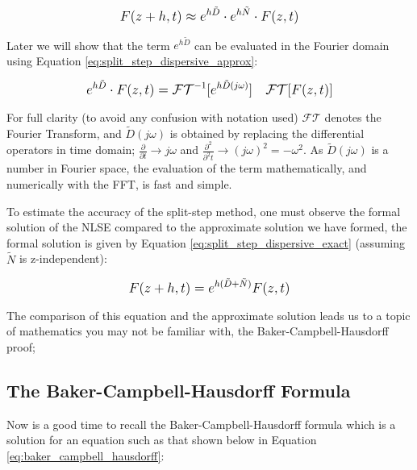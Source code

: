 \documentclass[colorlinks,11pt,a4paper,normalphoto,withhyper,ragged2e]{altareport}
\begin{document}
	\begin{equation} \label{eq:split_step_fourier_nlse_2}
		\mathlarger{ F(z + h, t) \approx e^{h \tilde{D}} \cdot e^{h \tilde{N}} \cdot F(z, t) }
	\end{equation}
	
	
	\vspace{5mm}
	
	
	Later we will show that the term $e^{h \tilde{D}}$  can be evaluated in the Fourier domain using Equation \ref{eq:split_step_dispersive_approx}:
	
	\begin{equation} \label{eq:split_step_dispersive_approx}
		\mathlarger{ e^{h \tilde{D}} \cdot F(z, t) = \mathcal{FT}^{-1}[e^{h \tilde{D}(j\omega)}] \quad \mathcal{FT}[F(z, t)] }
	\end{equation}
	
	
	\vspace{5mm}
	
	
	For full clarity (to avoid any confusion with notation used) $\mathcal{FT}$ denotes the Fourier Transform, and $\tilde{D}(j\omega)$ is obtained by replacing the differential operators in time domain; $\frac{\partial}{\partial t} \to j\omega$ and $\frac{\partial^2}{\partial ^2t} \to (j\omega)^2 = -\omega^2$. As $\tilde{D}(j\omega)$ is a number in Fourier space, the evaluation of the term mathematically, and numerically with the FFT, is fast and simple. \linebreak
	
	
	\pagebreak
	
	
	To estimate the accuracy of the split-step method, one must observe the formal solution of the NLSE compared to the approximate solution we have formed, the formal solution is given by Equation \ref{eq:split_step_dispersive_exact} (assuming $\tilde{N}$ is z-independent):
	
	\begin{equation} \label{eq:split_step_dispersive_exact}
		\mathlarger{ F(z+h, t) = e^{h (\tilde{D} + \tilde{N})} F(z, t) }
	\end{equation}
	
	
	\vspace{5mm}
	
	
	The comparison of this equation and the approximate solution leads us to a topic of mathematics you may not be familiar with, the Baker-Campbell-Hausdorff proof; \linebreak
	
	\subsection{The Baker-Campbell-Hausdorff Formula}
		Now is a good time to recall the Baker-Campbell-Hausdorff formula \cite{baker_campbell_hausdorff_wiki} which is a solution for an equation such as that shown below in Equation \ref{eq:baker_campbell_hausdorff}:
			
\end{document}
